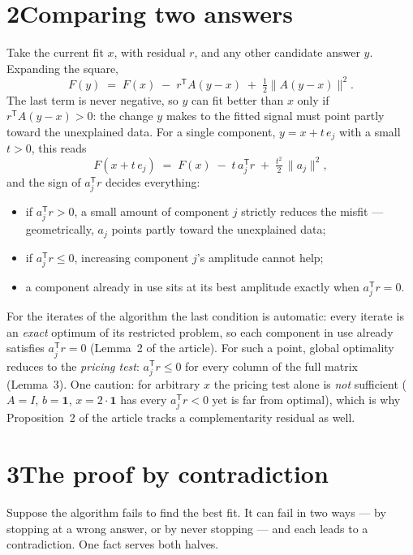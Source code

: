 \documentclass[pdflatex,sn-mathphys-num]{sn-jnl}
\newcommand{\T}{{\mathsf T}}
\begin{document}
\section*{2\quad Comparing two answers}

Take the current fit $x$, with residual $r$, and any other candidate
answer $y$. Expanding the square,
\begin{equation*}
F(y)\;=\;F(x)\;-\;r^{\T}A(y-x)\;+\;\tfrac12\lVert A(y-x)\rVert^2 .
\end{equation*}
The last term is never negative, so $y$ can fit better than $x$ only
if $r^{\T}A(y-x)>0$: the change $y$ makes to the fitted signal must
point partly toward the unexplained data. For a single component,
$y=x+t\,e_j$ with a small $t>0$, this reads
\begin{equation*}
F(x+t\,e_j)\;=\;F(x)\;-\;t\,a_j^{\T}r\;+\;\tfrac{t^2}{2}\,
\lVert a_j\rVert^2 ,
\end{equation*}
and the sign of $a_j^{\T}r$ decides everything:
\begin{itemize}
\item if $a_j^{\T}r>0$, a small amount of component $j$ strictly
  reduces the misfit --- geometrically, $a_j$ points partly toward the
  unexplained data;
\item if $a_j^{\T}r\le0$, increasing component $j$'s amplitude cannot
  help;
\item a component already in use sits at its best amplitude exactly
  when $a_j^{\T}r=0$.
\end{itemize}
For the iterates of the algorithm the last condition is automatic:
every iterate is an \emph{exact} optimum of its restricted problem, so
each component in use already satisfies $a_j^{\T}r=0$ (Lemma~2 of the
article). For such a point, global optimality reduces to the
\emph{pricing test}: $a_j^{\T}r\le0$ for every column of the full
matrix (Lemma~3). One caution: for arbitrary $x$ the pricing test
alone is \emph{not} sufficient ($A=I$, $b=\mathbf 1$,
$x=2\cdot\mathbf 1$ has every $a_j^{\T}r<0$ yet is far from optimal),
which is why Proposition~2 of the article tracks a complementarity
residual as well.

\section*{3\quad The proof by contradiction}

Suppose the algorithm fails to find the best fit. It can fail in two
ways --- by stopping at a wrong answer, or by never stopping --- and
each leads to a contradiction. One fact serves both halves.
\end{document}
